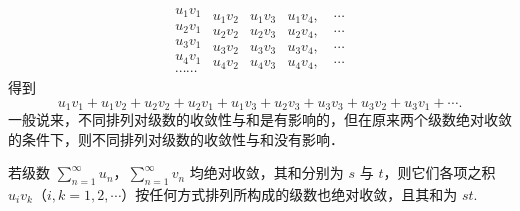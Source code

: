 \[
\begin{array}{l}\hline u_{1}v_{1}\\ \hline u_{2}v_{1}\\ \hline u_{3}v_{1}\\ \hline u_{4}v_{1}\\ \hline\cdots\cdots\end{array}
\begin{array}{l}u_{1}v_{2}\\ u_{2}v_{2}\\ u_{3}v_{2}\\ u_{4}v_{2}\end{array}
\begin{array}{l}u_{1}v_{3}\\ u_{2}v_{3}\\ u_{3}v_{3}\\ u_{4}v_{3}\end{array}
\begin{array}{l}u_{1}v_{4},\quad\cdots\\ u_{2}v_{4},\quad\cdots\\ u_{3}v_{4},\quad\cdots\\ u_{4}v_{4},\quad\cdots\end{array}
\]
得到
\[
u_{1}v_{1}+u_{1}v_{2}+u_{2}v_{2}+u_{2}v_{1}+u_{1}v_{3}+u_{2}v_{3}+u_{3}v_{3}+u_{3}v_{2}+u_{3}v_{1}+\cdots.
\]
一般说来，不同排列对级数的收敛性与和是有影响的，但在原来两个级数绝对收敛的条件下，则不同排列对级数的收敛性与和没有影响．

\begin{theorem}[柯西]\label{thm:10-22}
若级数 $\displaystyle\sum_{n=1}^{\infty}u_{n}$，$\sum_{n=1}^{\infty}v_{n}$ 均绝对收敛，其和分别为 $s$ 与 $t$，则它们各项之积 $u_{i}v_{k}$（$i,k=1,2,\cdots$）按任何方式排列所构成的级数也绝对收敛，且其和为 $st$.
\end{theorem}

